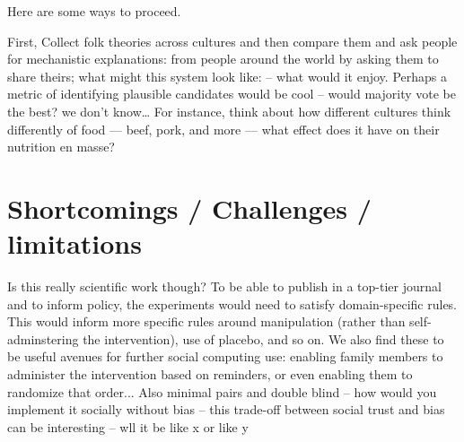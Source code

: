 Here are some ways to proceed.

First, Collect folk theories across cultures and then compare them and ask people for mechanistic explanations: from people around the world by asking them to share theirs; what might this system look like: -- what would it enjoy. Perhaps a metric of identifying plausible candidates would be cool -- would majority vote be the best? we don't know… For instance, think about how different cultures think differently of food — beef, pork, and more — what effect does it have on their nutrition en masse?



\section{Shortcomings / Challenges / limitations}
Is this really scientific work though? To be able to publish in a top-tier journal and to inform policy, the experiments would need to satisfy domain-specific rules. This would inform more specific rules around manipulation (rather than self-adminstering the intervention), use of placebo, and so on. We also find these to be useful avenues for further social computing use: enabling family members to administer the intervention based on reminders, or even enabling them to randomize that order... 
	Also minimal pairs and double blind -- how would you implement it socially without bias -- this trade-off between social trust and bias can be interesting -- wll it be like x or like y